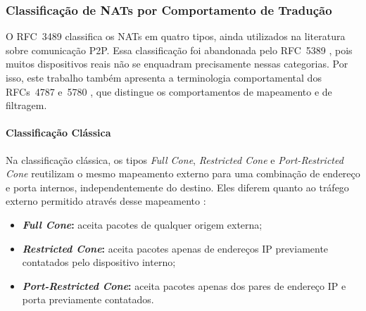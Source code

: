 \subsubsection{Classificação de NATs por Comportamento de Tradução}
\label{sec:nat_classification_by_translation_behavior}

O RFC~3489 \citep{RFC3489} classifica os NATs em quatro tipos, ainda utilizados na literatura sobre comunicação P2P. Essa classificação foi abandonada pelo RFC~5389 \citep{RFC5389}, pois muitos dispositivos reais não se enquadram precisamente nessas categorias. Por isso, este trabalho também apresenta a terminologia comportamental dos RFCs~4787 e~5780 \citep{RFC4787, RFC5780}, que distingue os comportamentos de mapeamento e de filtragem.

\paragraph{Classificação Clássica}

Na classificação clássica, os tipos \textit{Full Cone}, \textit{Restricted Cone} e \textit{Port-Restricted Cone} reutilizam o mesmo mapeamento externo para uma combinação de endereço e porta internos, independentemente do destino. Eles diferem quanto ao tráfego externo permitido através desse mapeamento \citep{RFC3489}:

\begin{itemize}
    \item \textbf{\textit{Full Cone}:} aceita pacotes de qualquer origem externa;
    \item \textbf{\textit{Restricted Cone}:} aceita pacotes apenas de endereços IP previamente contatados pelo dispositivo interno;
    \item \textbf{\textit{Port-Restricted Cone}:} aceita pacotes apenas dos pares de endereço IP e porta previamente contatados.
\end{itemize}

